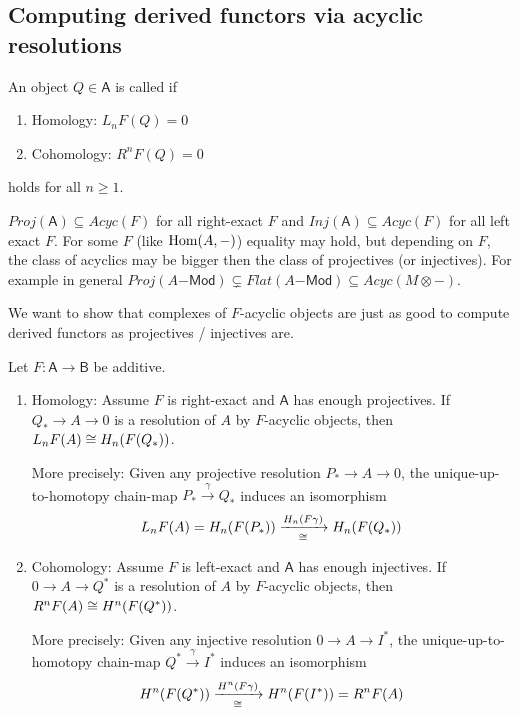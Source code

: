 \documentclass[fontsize=11pt,fleqn,a4paper]{scrartcl}
\begin{document}
\subsection{Computing derived functors via acyclic resolutions}

\begin{definition}
An object $Q\in\mathsf{A}$ is called  if
\begin{enumerate}
\item Homology: $L_n F(Q) = 0$
\item Cohomology: $R^n F(Q) = 0$
\end{enumerate}
holds for all $n\geq 1$.
\end{definition}

\begin{remark}
$Proj(\mathsf{A}) \subseteq Acyc(F)$ for all right-exact $F$ and $Inj(\mathsf{A})\subseteq Acyc(F)$ for all left exact $F$. For some $F$ (like $\operatorname{Hom}(A,-)$) equality may hold, but depending on $F$, the class of acyclics may be bigger then the class of projectives (or injectives). For example in general $Proj(A\mathsf{-Mod}) \subsetneq Flat(A\mathsf{-Mod}) \subseteq Acyc(M\otimes-)$.

We want to show that complexes of $F$-acyclic objects are just as good to compute derived functors as projectives / injectives are.
\end{remark}

\begin{theorem}
Let $F:\mathsf{A}\to\mathsf{B}$ be additive.
\begin{multicols}{2}
\begin{enumerate}
\item Homology: Assume $F$ is right-exact and $\mathsf{A}$ has enough projectives. If $Q_\ast \to A\to 0$ is a resolution of $A$ by $F$-acyclic objects, then $L_nF(A) \cong H_n(F(Q_\ast))$.

More precisely: Given any projective resolution $P_\ast \to A \to 0$, the unique-up-to-homotopy chain-map $P_\ast\xrightarrow{\gamma} Q_\ast$ induces an isomorphism 
\[L_nF(A) = H_n(F(P_\ast)) \xrightarrow[\cong]{H_n(F\gamma)} H_n(F(Q_\ast))\]

\item Cohomology: Assume $F$ is left-exact and $\mathsf{A}$ has enough injectives. If $0\to A\to Q^\ast$ is a resolution of $A$ by $F$-acyclic objects, then $R^nF(A) \cong H^n(F(Q^\ast))$.

More precisely: Given any injective resolution $0\to A\to I^\ast$, the unique-up-to-homotopy chain-map $Q^\ast\xrightarrow{\gamma} I^\ast$ induces an isomorphism
\[H^n(F(Q^\ast)) \xrightarrow[\cong]{H^n(F\gamma)} H^n(F(I^\ast))=R^nF(A)\]
\end{enumerate}
\end{multicols}
\end{theorem}
\end{document}
